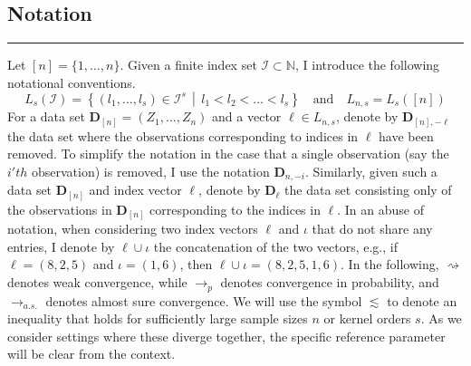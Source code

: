 \subsection{Notation}
\hrule
Let $[n] = \{1, \dotsc, n\}$.
Given a finite index set $\mathcal{I} \subset \mathbb{N}$, I introduce the following notational conventions.
\begin{equation}
	L_{s}(\mathcal{I}) = \left\{\left(l_1, \dotsc, l_s\right) \in \mathcal{I}^{s} \, \middle| \, l_{1} < l_{2} < \dotsc < l_{s}\right\}
	\quad \text{and} \quad
	L_{n,s} = L_s\left([n]\right)
\end{equation}
For a data set $\mathbf{D}_{[n]} = \left(Z_1, \dotsc, Z_{n}\right)$ and a vector $\ell \in L_{n,s}$, denote by $\mathbf{D}_{[n], -\ell}$ the data set where the observations corresponding to indices in $\ell$ have been removed.
To simplify the notation in the case that a single observation (say the $i'th$ observation) is removed, I use the notation $\mathbf{D}_{n, -i}$.
Similarly, given such a data set $\mathbf{D}_{[n]}$ and index vector $\ell$, denote by $\mathbf{D}_{\ell}$ the data set consisting only of the observations in $\mathbf{D}_{[n]}$ corresponding to the indices in $\ell$.
In an abuse of notation, when considering two index vectors $\ell$ and $\iota$ that do not share any entries, I denote by $\ell \cup \iota$ the concatenation of the two vectors, e.g., if $\ell = (8,2,5)$ and $\iota = (1,6)$, then $\ell \cup \iota = (8,2,5,1,6)$.
In the following, $\rightsquigarrow$ denotes weak convergence, while $\rightarrow_{p}$ denotes convergence in probability, and $\rightarrow_{a.s.}$ denotes almost sure convergence. 
We will use the symbol $\lesssim$ to denote an inequality that holds for sufficiently large sample sizes $n$ or kernel orders $s$. 
As we consider settings where these diverge together, the specific reference parameter will be clear from the context.

